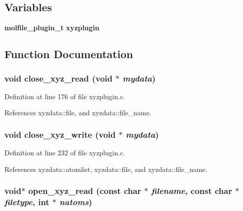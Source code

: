 \subsection*{Variables}
\begin{CompactItemize}
\item 
{\bf molfile\_\-plugin\_\-t} {\bf xyzplugin}
\end{CompactItemize}


\subsection{Function Documentation}
\subsubsection{\setlength{\rightskip}{0pt plus 5cm}void close\_\-xyz\_\-read (void $\ast$ {\em mydata})\hspace{0.3cm}{\tt  [static]}}\label{xyzplugin_8c_a4}




Definition at line 176 of file xyzplugin.c.

References xyzdata::file, and xyzdata::file\_\-name.
\subsubsection{\setlength{\rightskip}{0pt plus 5cm}void close\_\-xyz\_\-write (void $\ast$ {\em mydata})\hspace{0.3cm}{\tt  [static]}}\label{xyzplugin_8c_a8}




Definition at line 232 of file xyzplugin.c.

References xyzdata::atomlist, xyzdata::file, and xyzdata::file\_\-name.
\subsubsection{\setlength{\rightskip}{0pt plus 5cm}void$\ast$ open\_\-xyz\_\-read (const char $\ast$ {\em filename}, const char $\ast$ {\em filetype}, int $\ast$ {\em natoms})\hspace{0.3cm}{\tt  [static]}}\label{xyzplugin_8c_a1}




